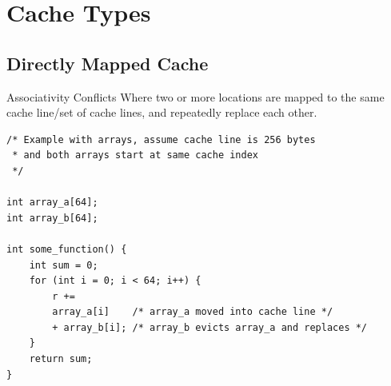 \section{Cache Types}
\subsection{Directly Mapped Cache}
\begin{definitionbox}{Associativity Conflicts}
    Where two or more locations are mapped to the same cache line/set of cache lines, and repeatedly replace each other.
    \begin{verbatim}
/* Example with arrays, assume cache line is 256 bytes
 * and both arrays start at same cache index 
 */

int array_a[64];
int array_b[64];

int some_function() {
    int sum = 0;
    for (int i = 0; i < 64; i++) {
        r += 
        array_a[i]    /* array_a moved into cache line */
        + array_b[i]; /* array_b evicts array_a and replaces */
    }
    return sum;
}
    \end{verbatim}
\end{definitionbox}

